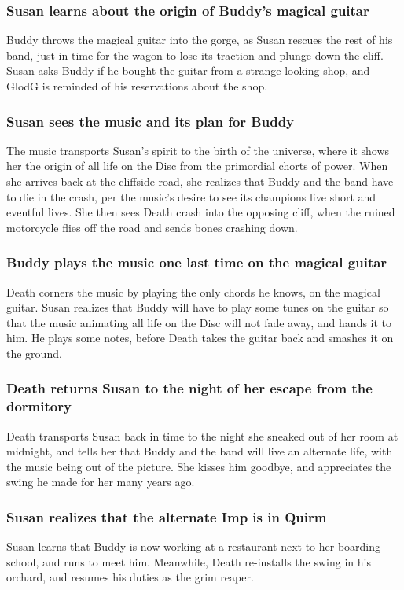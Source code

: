 \subsubsection{\Gls{Susan} learns about the origin of \Gls{Buddy}'s magical guitar}
\Gls{Buddy} throws the magical guitar into the gorge, as \Gls{Susan} rescues the rest of his band,
just in time for the wagon to lose its traction and plunge down the cliff. \Gls{Susan} asks
\Gls{Buddy} if he bought the guitar from a strange-looking shop, and \Gls{GlodG} is reminded of his
reservations about the shop.

\subsubsection{\Gls{Susan} sees the music and its plan for \Gls{Buddy}}
The music transports \Gls{Susan}'s spirit to the birth of the universe, where it shows her the
origin of all life on the Disc from the primordial chorts of power. When she arrives back at the
cliffside road, she realizes that \Gls{Buddy} and the band have to die in the crash, per the music's
desire to see its champions live short and eventful lives. She then sees \Gls{Death} crash into the
opposing cliff, when the ruined motorcycle flies off the road and sends bones crashing down.

\subsubsection{\Gls{Buddy} plays the music one last time on the magical guitar}
\Gls{Death} corners the music by playing the only chords he knows, on the magical guitar.
\Gls{Susan} realizes that \Gls{Buddy} will have to play some tunes on the guitar so that the music
animating all life on the Disc will not fade away, and hands it to him. He plays some notes,
before \Gls{Death} takes the guitar back and smashes it on the ground.

\subsubsection{\Gls{Death} returns \Gls{Susan} to the night of her escape from the dormitory}
\Gls{Death} transports \Gls{Susan} back in time to the night she sneaked out of her room at
midnight, and tells her that \Gls{Buddy} and the band will live an alternate life, with the music
being out of the picture. She kisses him goodbye, and appreciates the swing he made for her many
years ago.

\subsubsection{\Gls{Susan} realizes that the alternate \Gls{Imp} is in Quirm}
\Gls{Susan} learns that \Gls{Buddy} is now working at a restaurant next to her boarding school, and
runs to meet him. Meanwhile, \Gls{Death} re-installs the swing in his orchard, and resumes his
duties as the grim reaper.